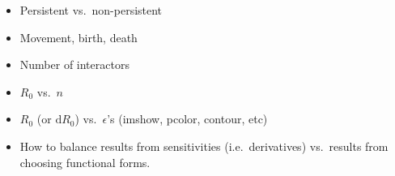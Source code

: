 \documentclass{article}
\newcommand{\md}{\mathrm{d}}
\begin{document}
\begin{itemize}
\item Persistent vs.~non-persistent
\item Movement, birth, death
\item Number of interactors
\end{itemize}

\begin{itemize}
\item $R_0$ vs.~$n$
\item $R_0$ (or $\md R_0$) vs.~$\epsilon$'s (imshow, pcolor, contour,
  etc)
\item How to balance results from sensitivities (i.e.~derivatives)
  vs.~results from choosing functional forms.
\end{itemize}
\end{document}
